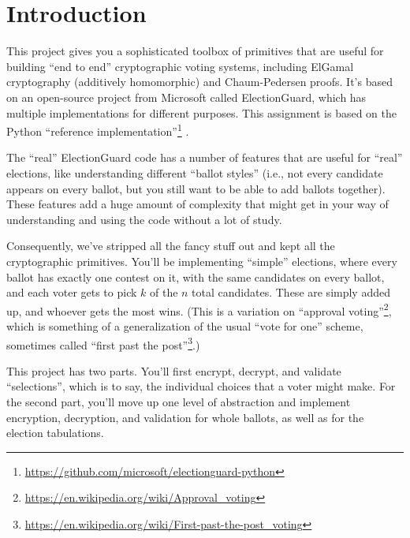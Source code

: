 

\handout
\setlength{\parindent}{0pt}
\problemsetheader
\setlength{\parindent}{20pt}

\tableofcontents

\vspace*{-15pt}
\section{Introduction}

This project gives you a sophisticated toolbox of primitives that are
useful for building ``end to end'' cryptographic voting systems,
including ElGamal cryptography (additively homomorphic) and
Chaum-Pedersen proofs. It's based on an open-source project from
Microsoft called ElectionGuard, which has multiple implementations
for different purposes. This assignment is based on the Python
``reference implementation''\footnote{\url{https://github.com/microsoft/electionguard-python}}
.

The ``real'' ElectionGuard code has a number of features that are
useful for ``real'' elections, like understanding different ``ballot
styles'' (i.e., not every candidate appears on every ballot, but you
still want to be able to add ballots together). These features add
a huge amount of complexity that might get in your way of
understanding and using the code without a lot of study.

Consequently, we've stripped all the fancy stuff out and kept all the
cryptographic primitives. You'll be implementing ``simple'' elections,
where every ballot has exactly one contest on it, with the same
candidates on every ballot, and each voter gets to pick $k$ of the $n$
total candidates. These are simply added up, and whoever gets the
most wins.
(This is a variation on ``approval
voting''\footnote{\url{https://en.wikipedia.org/wiki/Approval_voting}},
which is something of a generalization of the usual ``vote for one''
scheme, sometimes called ``first past the
post''\footnote{\url{https://en.wikipedia.org/wiki/First-past-the-post_voting}}.)

This project has two parts. You'll first encrypt, decrypt, and
validate ``selections'', which is to say, the individual choices that
a voter might make. For the second part, you'll move up one level of
abstraction and implement encryption, decryption, and validation for
whole ballots, as well as for the election tabulations.

